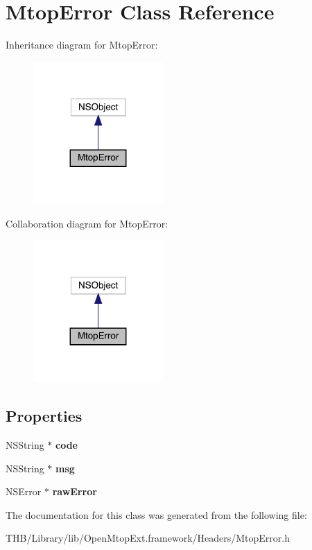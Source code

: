 \hypertarget{interface_mtop_error}{}\section{Mtop\+Error Class Reference}
\label{interface_mtop_error}


Inheritance diagram for Mtop\+Error\+:\nopagebreak
\begin{figure}[H]
\begin{center}
\leavevmode
\includegraphics[width=140pt]{interface_mtop_error__inherit__graph}
\end{center}
\end{figure}


Collaboration diagram for Mtop\+Error\+:\nopagebreak
\begin{figure}[H]
\begin{center}
\leavevmode
\includegraphics[width=140pt]{interface_mtop_error__coll__graph}
\end{center}
\end{figure}
\subsection*{Properties}
\begin{DoxyCompactItemize}
\item 
\mbox{\label{interface_mtop_error_a334fc73aedd8c62d2c3f757e1df72bbf}} 
N\+S\+String $\ast$ {\bfseries code}
\item 
\mbox{\label{interface_mtop_error_ae1359eafd61dc6402b67c54e5b3801af}} 
N\+S\+String $\ast$ {\bfseries msg}
\item 
\mbox{\label{interface_mtop_error_ad4c164ef253950eeae5dd3ffd832a4b9}} 
N\+S\+Error $\ast$ {\bfseries raw\+Error}
\end{DoxyCompactItemize}


The documentation for this class was generated from the following file\+:\begin{DoxyCompactItemize}
\item 
T\+H\+B/\+Library/lib/\+Open\+Mtop\+Ext.\+framework/\+Headers/Mtop\+Error.\+h\end{DoxyCompactItemize}
